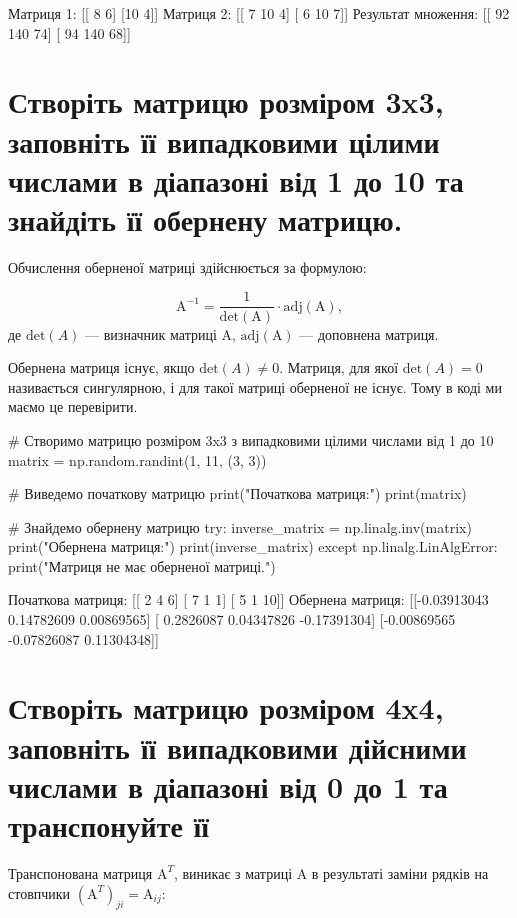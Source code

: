 \documentclass[]{article}
\newcounter{pythoncode}
\begin{document}
\begin{out}
	Матриця 1:
	[[ 8  6]
	 [10  4]]
	Матриця 2:
	[[ 7 10  4]
	 [ 6 10  7]]
	Результат множення:
	[[ 92 140  74]
	 [ 94 140  68]]
\end{out}

\section{Створіть матрицю розміром 3x3, заповніть її випадковими цілими числами в діапазоні від 1 до 10 та знайдіть її обернену матрицю.}

Обчислення оберненої матриці здійснюється за формулою:

\[ \mathrm{A}^{-1} = \frac{1}{\mathrm{det}(\mathrm{A})} \cdot \mathrm{adj}(\mathrm{A}), \]
де $ \mathrm{det}(A) $ --- визначник матриці \(\mathrm A\),
\(\mathrm{adj}(\mathrm{A})\) --- доповнена матриця.

Обернена матриця існує, якщо $ \mathrm{det}(A) \neq 0$. Матриця, для
якої $ \mathrm{det}(A) = 0$ називається сингулярною, і для такої
матриці оберненої не існує. Тому в коді ми маємо це перевірити.

\begin{pythoncode}
    # Створимо матрицю розміром 3x3 з випадковими цілими числами від 1 до 10
    matrix = np.random.randint(1, 11, (3, 3))

    # Виведемо початкову матрицю
    print("Початкова матриця:")
    print(matrix)

    # Знайдемо обернену матрицю
    try:
        inverse_matrix = np.linalg.inv(matrix)
        print("Обернена матриця:")
        print(inverse_matrix)
    except np.linalg.LinAlgError:
        print("Матриця не має оберненої матриці.")
\end{pythoncode}

\begin{out}
	Початкова матриця:
	[[ 2  4  6]
	 [ 7  1  1]
	 [ 5  1 10]]
	Обернена матриця:
	[[-0.03913043  0.14782609  0.00869565]
	 [ 0.2826087   0.04347826 -0.17391304]
	 [-0.00869565 -0.07826087  0.11304348]]
\end{out}

\section{Створіть матрицю розміром 4x4, заповніть її випадковими дійсними числами в діапазоні від 0 до 1 та транспонуйте її}

Транспонована матриця \(\mathrm{A}^T\), виникає з матриці \(\mathrm{A}\)
в результаті заміни рядків на стовпчики $(\mathrm{A}^{T})_{ji} =
	\mathrm{A}_{ij} $:
\end{document}
